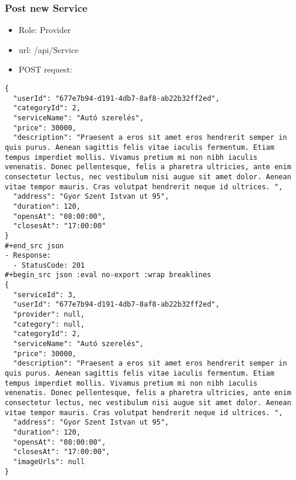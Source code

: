 \documentclass[11pt]{article}
\begin{document}
\subsubsection{Post new Service}
\label{sec:orga03e094}
\begin{itemize}
\item Role: Provider
\item url: /api/Service
\item POST request:
\end{itemize}
\begin{verbatim}
{
  "userId": "677e7b94-d191-4db7-8af8-ab22b32ff2ed",
  "categoryId": 2,
  "serviceName": "Autó szerelés",
  "price": 30000,
  "description": "Praesent a eros sit amet eros hendrerit semper in quis purus. Aenean sagittis felis vitae iaculis fermentum. Etiam tempus imperdiet mollis. Vivamus pretium mi non nibh iaculis venenatis. Donec pellentesque, felis a pharetra ultricies, ante enim consectetur lectus, nec vestibulum nisi augue sit amet dolor. Aenean vitae tempor mauris. Cras volutpat hendrerit neque id ultrices. ",
  "address": "Gyor Szent Istvan ut 95",
  "duration": 120,
  "opensAt": "08:00:00",
  "closesAt": "17:00:00"
}
#+end_src json
- Response:
  - StatusCode: 201
#+begin_src json :eval no-export :wrap breaklines
{
  "serviceId": 3,
  "userId": "677e7b94-d191-4db7-8af8-ab22b32ff2ed",
  "provider": null,
  "category": null,
  "categoryId": 2,
  "serviceName": "Autó szerelés",
  "price": 30000,
  "description": "Praesent a eros sit amet eros hendrerit semper in quis purus. Aenean sagittis felis vitae iaculis fermentum. Etiam tempus imperdiet mollis. Vivamus pretium mi non nibh iaculis venenatis. Donec pellentesque, felis a pharetra ultricies, ante enim consectetur lectus, nec vestibulum nisi augue sit amet dolor. Aenean vitae tempor mauris. Cras volutpat hendrerit neque id ultrices. ",
  "address": "Gyor Szent Istvan ut 95",
  "duration": 120,
  "opensAt": "08:00:00",
  "closesAt": "17:00:00",
  "imageUrls": null
}
\end{verbatim}
\end{document}
